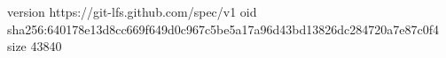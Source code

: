 version https://git-lfs.github.com/spec/v1
oid sha256:640178e13d8cc669f649d0c967c5be5a17a96d43bd13826dc284720a7e87c0f4
size 43840
